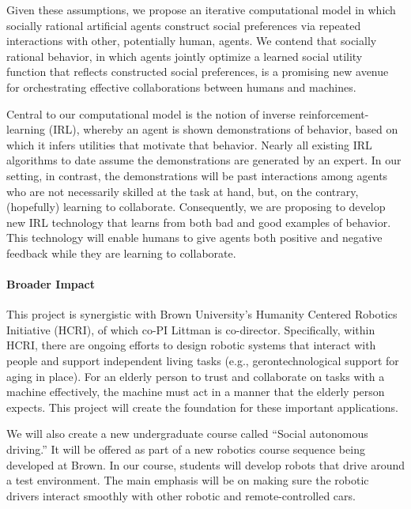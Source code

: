 Given these assumptions, we propose an iterative computational model
in which socially rational artificial agents construct social
preferences via repeated interactions with other, potentially human,
agents.  We contend that socially rational behavior, in which agents
jointly optimize a learned social utility function that reflects
constructed social preferences, is a promising new avenue for
orchestrating effective collaborations between humans and machines.

Central to our computational model is the notion of inverse
reinforcement-learning (IRL), whereby an agent is shown demonstrations
of behavior, based on which it infers utilities that motivate that
behavior.  Nearly all existing IRL algorithms to date assume the
demonstrations are generated by an expert.  In our setting, in contrast, the
demonstrations will be past interactions among agents who are not
necessarily skilled at the task at hand, but, on the contrary,
(hopefully) learning to collaborate.  Consequently, we are proposing
to develop new IRL technology that learns from
both bad and good examples of behavior.  This
technology will enable humans to give agents both positive and
negative feedback while they are learning to collaborate.




\vspace{\up}
\paragraph{Broader Impact}
%
This project is synergistic with Brown
University's Humanity Centered Robotics Initiative (HCRI), of which
co-PI Littman is co-director.  Specifically, within HCRI, there are
ongoing efforts to design robotic systems that interact with people
and support independent living tasks (e.g., gerontechnological support
for aging in place).  For an elderly person to trust and collaborate on tasks with a machine effectively,
the machine must act in a manner that the elderly person
expects.  This project will create the foundation for these important
applications.

We will also create a new undergraduate course called ``Social
autonomous driving.''  It will be offered as part of a new robotics
course sequence being developed at Brown.  In our course, students
will develop robots that drive around a test environment.  The main
emphasis will be on making sure the robotic drivers interact smoothly
with other robotic and remote-controlled cars.

